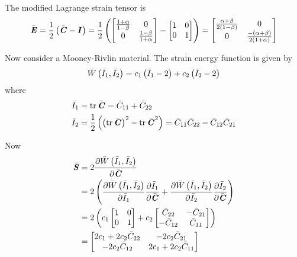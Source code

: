 The modified Lagrange strain tensor is
\begin{equation}
  \bar{\boldsymbol{\mathit{E}}} = \frac{1}{2}\left( \bar{\boldsymbol{\mathit{C}}}-\boldsymbol{\mathit{I}} \right) = \frac{1}{2}\left( \begin{bmatrix}
    \frac{1+\alpha}{1-\beta} & 0  \\
    0 & \frac{1-\beta}{1+\alpha}
  \end{bmatrix} - \begin{bmatrix}
    1 & 0 \\
    0 & 1
  \end{bmatrix} \right) = \begin{bmatrix}
    \frac{\alpha+\beta}{2\left( 1-\beta \right)} & 0 \\
    0 & \frac{-\left( \alpha+\beta \right)}{2\left( 1+\alpha \right)}
  \end{bmatrix}
\end{equation}

Now consider a Mooney-Rivlin material. The strain energy function is given by
\begin{equation}
   \bar{W}\left( \bar{I}_{1},\bar{I}_{2} \right) =c_{1}\left( \bar{I}_{1}-2 \right)+c_{2}\left( \bar{I}_{2}-2 \right)
\end{equation}
where
\begin{equation}
  \begin{split}
    \bar{I}_{1}&=\trace{}{\bar{\tensor{C}}}=\bar{C}_{11}+\bar{C}_{22}\\
    \bar{I}_{2}&=\frac{1}{2}\pbrac{\pbrac{\trace{}{\bar{\tensor{C}}}}^{2}-\trace{}{\bar{\tensor{C}}^{2}}}=\bar{C}_{11}\bar{C}_{22}-\bar{C}_{12}\bar{C}_{21}
  \end{split}
\end{equation}

Now
\begin{equation}
  \begin{split}
    \bar{\boldsymbol{\mathit{S}}}&=2 \dfrac{\partial  \bar{W}\left( \bar{I}_{1},\bar{I}_{2} \right) }{\partial \bar{\boldsymbol{\mathit{C}}}} \\
    &=2\left(  \dfrac{\partial  \bar{W}\left( \bar{I}_{1},\bar{I}_{2} \right) }{\partial \bar{I}_{1}}  \dfrac{\partial \bar{I}_{1}}{\partial \bar{\boldsymbol{\mathit{C}}}} + \dfrac{\partial  \bar{W}\left( \bar{I}_{1},\bar{I}_{2} \right) }{\partial \bar{I}_{2}}  \dfrac{\partial \bar{I}_{2}}{\partial \bar{\boldsymbol{\mathit{C}}}}  \right)\\
    &=2\left( c_{1}\begin{bmatrix}
        1 & 0 \\
        0 & 1
    \end{bmatrix}+c_{2}\begin{bmatrix}
        \bar{C}_{22} & -\bar{C}_{21} \\
        -\bar{C}_{12} & \bar{C}_{11}
    \end{bmatrix} \right) \\
    &=\begin{bmatrix}
        2c_{1}+2c_{2}\bar{C}_{22} & -2c_{2}\bar{C}_{21} \\
        -2c_{2}\bar{C}_{12} & 2c_{1}+2c_{2}\bar{C}_{11}
    \end{bmatrix}
  \end{split}
\end{equation}

